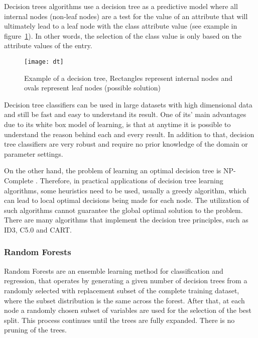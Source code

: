 Decision trees algorithms use a decision tree as a predictive model where all internal nodes (non-leaf nodes) are a test for the value of an attribute that will
ultimately lead to a leaf node with the class attribute value (see example in figure~\ref{fig:dtree}).
In other words, the selection of the class value is only based on the attribute values of the entry.\cite{HanKam06}

\begin{figure}[h]
  \begin{center}
    \leavevmode
    \texttt{[image: dt]}
    \caption{Example of a decision tree, Rectangles represent internal nodes and ovals represent leaf nodes (possible solution)\cite{KER:70953}}
    \label{fig:dtree}
  \end{center}
\end{figure}

Decision tree classifiers can be used in large datasets with high dimensional data and still be fast and easy to understand its result.
One of its' main advantages due to its white box model of learning, is that at anytime it is possible to understand the reason behind each and every result.
In addition to that, decision tree classifiers are very robust and require no prior knowledge of the domain or parameter settings.

On the other hand, the problem of learning an optimal decision tree is NP-Complete \cite{Hyafil197615}.
Therefore, in practical applications of decision tree learning algorithms, some heuristics need to be used,
usually a greedy algorithm, which can lead
to local optimal decisions being made for each node. The utilization of such algorithms cannot guarantee the global optimal solution to the problem.
There are many algorithms that implement the decision tree principles, such as ID3, C5.0 and CART.

\subsubsection{Random Forests}

Random Forests \cite{raey} are an ensemble learning method for classification and regression, that operates by generating a given number of 
decision trees from a randomly selected with replacement subset of the complete training dataset, where the subset distribution is the same across the forest.
After that, at each node a randomly chosen subset of variables are used for the
selection of the best split.
This process continues until the trees are fully expanded. There is no pruning of the trees.

